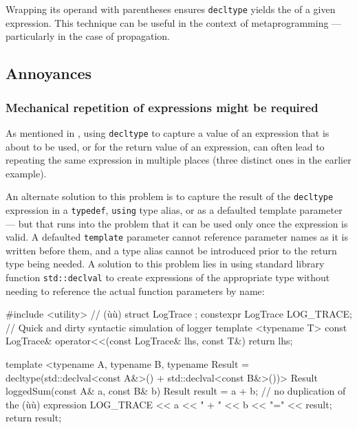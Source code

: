 \noindent Wrapping its operand with parentheses ensures \lstinline!decltype! yields
the  of a given expression. This technique can be
useful in the context of metaprogramming --- particularly in the case of
 propagation.

\subsection[Annoyances]{Annoyances}\label{annoyances-decltype}

\subsubsection{Mechanical repetition of expressions might be required}\label{decltype-mechanical}

As mentioned in
,
using \lstinline!decltype! to capture a value of an expression that is about to be used, or for the return value of an expression, can often lead to repeating the same expression in multiple places (three distinct ones in the earlier example).

An alternate solution to this problem is to capture the result of the \lstinline!decltype! expression in a \lstinline!typedef!, \lstinline!using! type alias, or as a defaulted template parameter --- but that runs into the problem that it can be used only once the expression is valid.  A defaulted \lstinline!template! parameter cannot reference parameter names as it is written before them, and a type alias cannot be introduced prior to the return type being needed.  A solution to this problem lies in using standard library function \lstinline!std::declval! to create expressions of the appropriate type without needing to reference the actual function parameters by name:

\begin{emcppshiddenlisting}[emcppsbatch=e11]
#include <utility>  // (ù{}ù)
struct LogTrace {};  
constexpr LogTrace LOG_TRACE; // Quick and dirty syntactic simulation of logger
template <typename T>
const LogTrace& operator<<(const LogTrace& lhs, const T&) { return lhs; }
\end{emcppshiddenlisting}
\begin{emcppslisting}[emcppsbatch=e11]
template <typename A, typename B,
          typename Result = decltype(std::declval<const A&>() +
                                     std::declval<const B&>())>
Result loggedSum(const A& a, const B& b)
{
    Result result = a + b;  // no duplication of the (ù{}ù) expression
    LOG_TRACE << a << " + " << b << "=" << result;
    return result;
}
\end{emcppslisting}

